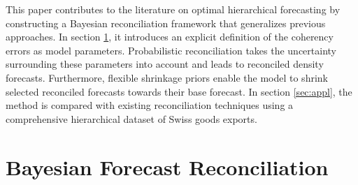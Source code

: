 \documentclass[a4paper,fleqn,11pt]{article}
\begin{document}
This paper contributes to the literature on optimal hierarchical forecasting by constructing a Bayesian reconciliation framework that generalizes previous approaches. In section \ref{sec:model}, it introduces an explicit definition of the coherency errors as model parameters. Probabilistic reconciliation takes the uncertainty surrounding these parameters into account and leads to reconciled density forecasts. Furthermore, flexible shrinkage priors enable the model to shrink selected reconciled forecasts towards their base forecast. In section \ref{sec:appl}, the method is compared with existing reconciliation techniques using a comprehensive hierarchical dataset of Swiss goods exports.

\clearpage

\section{Bayesian Forecast Reconciliation}
\label{sec:model}
\end{document}

